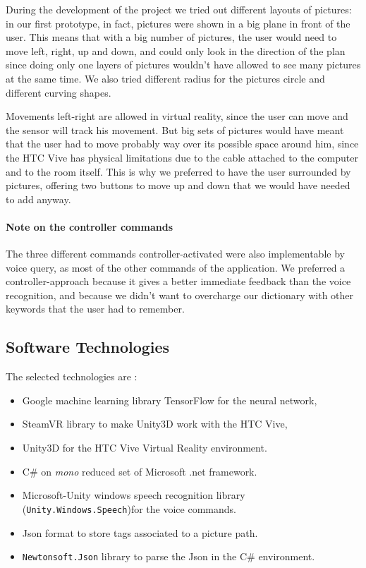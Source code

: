\documentclass[11pt,a4paper]{article}
\begin{document}
During the development of the project we tried out different layouts of pictures: in our first prototype, in fact, pictures were shown in a big plane in front of the user. This means that with a big number of pictures, the user would need to move left, right, up and down, and could only look in the direction of the plan since doing only one layers of pictures wouldn't have allowed to see many pictures at the same time. We also tried different radius for the pictures circle and different curving shapes.

Movements left-right are allowed in virtual reality, since the user can move and the sensor will track his movement. But big sets of pictures would have meant that the user had to move probably way over its possible space around him, since the HTC Vive has physical limitations due to the cable attached to the computer and to the room itself.
This is why we preferred to have the user surrounded by pictures, offering two buttons to move up and down that we would have needed to add anyway.

\paragraph{Note on the controller commands} The three different commands controller-activated were also implementable by voice query, as most of the other commands of the application.
We preferred a controller-approach because it gives a better immediate feedback than the voice recognition, and because we didn't want to overcharge our dictionary with other keywords that the user had to remember.
\subsection{Software Technologies} \label{techntechno}

The selected technologies are :
\begin{itemize}
	\item Google machine learning library TensorFlow for the neural network,
	\item SteamVR library to make Unity3D work with the HTC Vive,
	\item Unity3D for the HTC Vive Virtual Reality environment.
	\item C$\#$ on \textit{mono} reduced set of Microsoft .net framework.
	\item Microsoft-Unity windows speech recognition library (\texttt{Unity.Windows.Speech})for the voice commands.
	\item Json format to store tags associated to a picture path.
	\item \texttt{Newtonsoft.Json} library to parse the Json in the C$\#$ environment.
\end{itemize}
\end{document}
